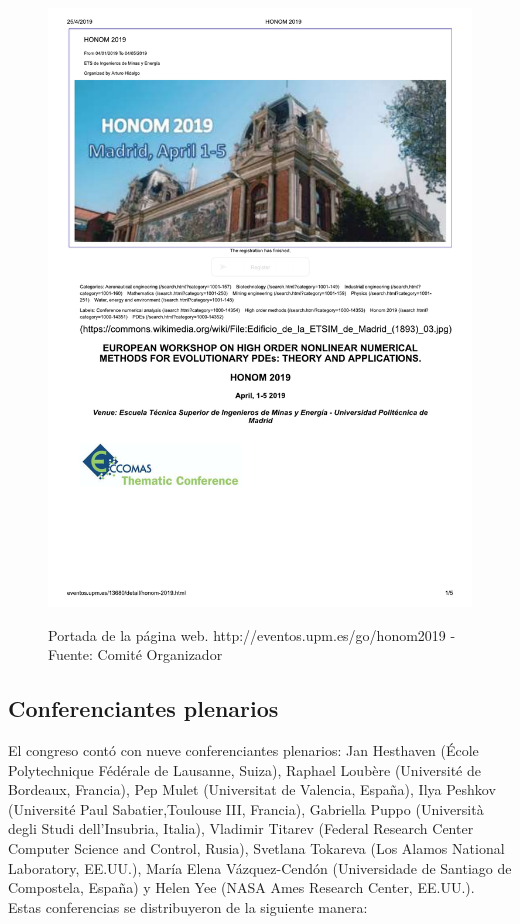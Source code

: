 \documentclass[twoside]{article}
\begin{document}
\begin{center}
\begin{figure}
	\centering
		\includegraphics[width=.85\textwidth]{Web}
	\label{fig:WebFront}
	\caption{Portada de la página web. http://eventos.upm.es/go/honom2019  - Fuente: Comité Organizador}
\end{figure}
\end{center}

\subsection{Conferenciantes plenarios}

El congreso contó con nueve conferenciantes plenarios: Jan Hesthaven (École Polytechnique Fédérale de Lausanne, Suiza), Raphael Loubère	(Université de Bordeaux, Francia), Pep Mulet	(Universitat de Valencia, España), Ilya Peshkov	(Université Paul Sabatier,Toulouse III, Francia), Gabriella Puppo	(Università degli Studi dell'Insubria, Italia), Vladimir Titarev	(Federal Research Center Computer Science and Control, Rusia), Svetlana Tokareva	(Los Alamos National Laboratory, EE.UU.), María Elena Vázquez-Cendón	(Universidade de Santiago de Compostela, España) y Helen Yee	(NASA Ames Research Center, EE.UU.). Estas conferencias se distribuyeron de la siguiente manera:
\end{document}
